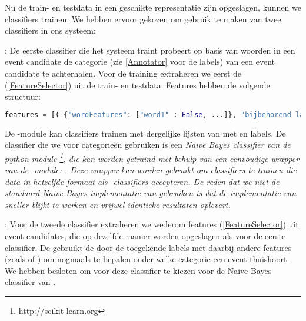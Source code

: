 {{Nu de train- en testdata in een geschikte representatie zijn opgeslagen, kunnen 
we classifiers trainen. We hebben ervoor gekozen om gebruik te maken van twee 
classifiers in ons systeem:

\begin{bullets}
\item {}: De eerste classifier die het systeem traint probeert op 
basis van woorden in een event candidate de categorie (zie \ref{Annotator} voor de labels) 
van een event candidate te achterhalen. Voor de training extraheren we eerst de 
 (\ref{FeatureSelector}) uit de train- en testdata. Features hebben de volgende 
structuur:

\begin{lstlisting}[language=Python]
features = [( {"wordFeatures": ["word1" : False, ...]}, "bijbehorend label"), ...]
\end{lstlisting}

De -module kan classifiers trainen met dergelijke lijsten van  met 
 en labels. De classifier die we voor categorie\"en gebruiken 
is een \it{Naive Bayes} classifier van de python-module \footnote{\url{http://scikit-learn.org}}, die kan worden 
getraind met behulp van een eenvoudige wrapper van de -module: 
. Deze wrapper kan worden gebruikt om  classifiers 
te trainen die data in hetzelfde formaat als -classifiers accepteren. De 
reden dat we niet de standaard Naive Bayes implementatie van  gebruiken is 
dat de implementatie van  sneller blijkt te werken en vrijwel 
identieke resultaten oplevert.
\item {}: Voor de tweede classifier extraheren we wederom features 
(\ref{FeatureSelector}) uit event candidates, die op dezelfde manier worden opgeslagen als voor 
de eerste classifier. De  gebruikt de door de  
toegekende labels met daarbij andere features (zoals  of 
) om nogmaals te bepalen onder welke categorie een event thuishoort. We 
hebben besloten om voor deze classifier te kiezen voor de Naive Bayes classifier 
van .
\end{bullets}

}}
